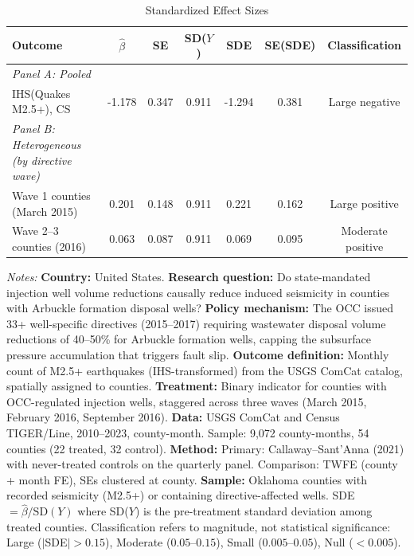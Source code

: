 \begin{table}[htbp]
\centering
\caption{Standardized Effect Sizes}
\label{tab:sde}
\begin{threeparttable}
\footnotesize
\setlength{\tabcolsep}{4pt}
\begin{tabular}{@{}lcccccc@{}}
\toprule
Outcome & $\hat{\beta}$ & SE & SD($Y$) & SDE & SE(SDE) & Classification \\
\midrule
\textit{Panel A: Pooled} & & & & & & \\
IHS(Quakes M2.5+), CS & -1.178 & 0.347 & 0.911 & -1.294 & 0.381 & Large negative \\
\midrule
\textit{Panel B: Heterogeneous (by directive wave)} & & & & & & \\
Wave 1 counties (March 2015) & 0.201 & 0.148 & 0.911 & 0.221 & 0.162 & Large positive \\
Wave 2--3 counties (2016) & 0.063 & 0.087 & 0.911 & 0.069 & 0.095 & Moderate positive \\
\bottomrule
\end{tabular}
\begin{tablenotes}[flushleft]
\footnotesize\sloppy
\item \textit{Notes:}
\textbf{Country:} United States.
\textbf{Research question:} Do state-mandated injection well volume reductions causally reduce induced seismicity in counties with Arbuckle formation disposal wells?
\textbf{Policy mechanism:} The OCC issued 33+ well-specific directives (2015--2017) requiring wastewater disposal volume reductions of 40--50\% for Arbuckle formation wells, capping the subsurface pressure accumulation that triggers fault slip.
\textbf{Outcome definition:} Monthly count of M2.5+ earthquakes (IHS-transformed) from the USGS ComCat catalog, spatially assigned to counties.
\textbf{Treatment:} Binary indicator for counties with OCC-regulated injection wells, staggered across three waves (March 2015, February 2016, September 2016).
\textbf{Data:} USGS ComCat and Census TIGER/Line, 2010--2023, county-month. Sample: 9,072 county-months, 54 counties (22 treated, 32 control).
\textbf{Method:} Primary: Callaway--Sant'Anna (2021) with never-treated controls on the quarterly panel. Comparison: TWFE (county + month FE), SEs clustered at county.
\textbf{Sample:} Oklahoma counties with recorded seismicity (M2.5+) or containing directive-affected wells.
SDE $= \hat{\beta} / \text{SD}(Y)$ where SD($Y$) is the pre-treatment standard deviation among treated counties.
Classification refers to magnitude, not statistical significance: Large ($|$SDE$| > 0.15$), Moderate ($0.05$--$0.15$), Small ($0.005$--$0.05$), Null ($< 0.005$).
\end{tablenotes}
\end{threeparttable}
\end{table}
